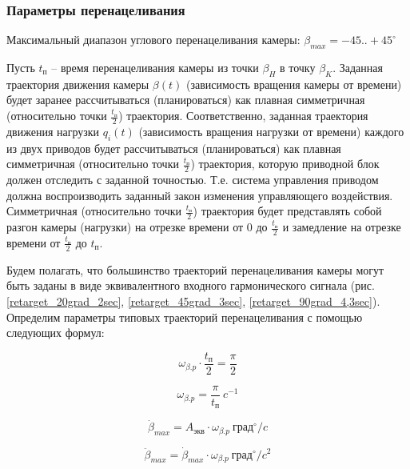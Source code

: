 \subsubsection{Параметры перенацеливания}

Максимальный диапазон углового перенацеливания камеры:
$\beta_{max} = -45..+45^{\circ}$

Пусть $t_\text{п}$ – время перенацеливания камеры из точки $\beta_{H}$ в точку $\beta_{K}$.
Заданная траектория движения камеры $\beta(t)$ (зависимость вращения камеры от времени)
будет заранее рассчитываться (планироваться) как плавная симметричная
(относительно точки $\frac{t_\text{п} }{2}$) траектория.
Соответственно, заданная траектория движения нагрузки $q_{i}(t)$
(зависимость вращения нагрузки от времени) каждого из двух приводов будет рассчитываться
(планироваться) как плавная симметричная (относительно точки $\frac{t_\text{п} }{2}$)
траектория, которую приводной блок должен отследить с заданной точностью.
Т.е. система управления приводом должна воспроизводить заданный закон изменения управляющего
воздействия.
Симметричная (относительно точки $\frac{t_\text{п} }{2}$) траектория будет представлять
собой разгон камеры (нагрузки) на отрезке времени от 0 до $\frac{t_\text{п} }{2}$
и замедление на отрезке времени от $\frac{t_\text{п} }{2}$ до $t_\text{п}$.

Будем полагать, что большинство траекторий перенацеливания камеры могут быть заданы
в виде эквивалентного входного гармонического сигнала
(рис. \ref{retarget_20grad_2sec},
\ref{retarget_45grad_3sec},
\ref{retarget_90grad_4,3sec}).
Определим параметры типовых траекторий перенацеливания с помощью следующих формул:

\begin{equation}
    \label{retarget_angle}
    \omega_{\beta.p} \cdot \frac{t_\text{п} }{2} = \frac{\pi}{2}
\end{equation}

\begin{equation}
    \label{equiv_signal_frequency}
    \omega_{\beta.p} = \frac{\pi}{t_\text{п} } ~c^{-1}
\end{equation}

\begin{equation}
    \label{max_speed_for_equiv_signal}
    \dot{\beta}_{max} = A_\text{экв} \cdot \omega_{\beta.p} ~\text{град}^{\circ} / c
\end{equation}

\begin{equation}
    \label{max_acceleration_for_equiv_signal}
    \ddot{\beta}_{max} = \dot{\beta}_{max} \cdot \omega_{\beta.p} ~\text{град}^{\circ} / c^{2}
\end{equation}

